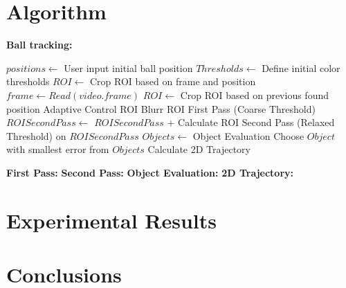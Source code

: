 \documentclass[a4paper]{article}
\begin{document}
\section{Algorithm}
\textbf{Ball tracking:}
\begin{algorithmic}
    \State $ positions \gets$ User input initial ball position
    \State $ Thresholds \gets$ Define initial color thresholds
    \State $ ROI \gets$ Crop ROI based on frame and position
    \State $frame \gets Read(video.frame)$
		\State $ROI \gets$ Crop ROI based on previous found position
\Else
{}
	\State Adaptive Control ROI
\EndIf
\State Blurr ROI
\State First Pass (Coarse Threshold)
		\State $ROISecondPass \gets$  $ROISecondPass$ + Calculate ROI
	\EndFor
\State Second Pass (Relaxed Threshold) on $ROISecondPass$
\State $Objects \gets$ Object Evaluation 
\State Choose $Object$ with smallest error from $Objects$
\EndIf
\EndWhile
\State Calculate 2D Trajectory
\end{algorithmic}

\textbf{First Pass:}
\textbf{Second Pass:}
\textbf{Object Evaluation:}
\textbf{2D Trajectory:}
\textbf{}

\section{Experimental Results}
\section{Conclusions}
\end{document}
